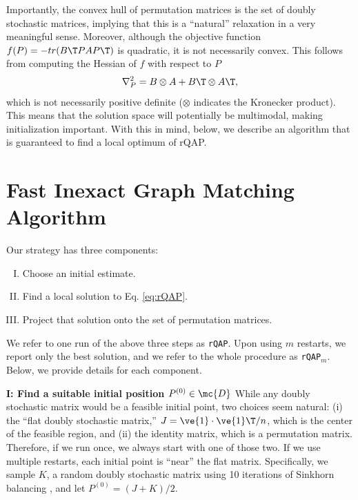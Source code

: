 \documentclass[10pt,journal,cspaper,compsoc]{IEEEtran}
\begin{document}
Importantly, the convex hull of permutation matrices is the set of doubly stochastic matrices, implying that this is a ``natural'' relaxation in a very meaningful sense.    Moreover, although the objective function $f(P)=- tr(B\T PAP\T)$ is quadratic, it is not necessarily convex.  This follows from computing the Hessian of $f$  with respect to $P$
\begin{align}
	\nabla_P^2  =  B \otimes A + B\T \otimes A\T,
\end{align}
which is not necessarily positive definite ($\otimes$ indicates the Kronecker product). This means that the solution space will potentially be multimodal, making initialization important.  With this in mind, below, we describe an algorithm that is guaranteed to find a local optimum of rQAP.


\section{Fast Inexact Graph Matching Algorithm} %
\label{ssub:graph_matching}


Our strategy has three components:
\begin{enumerate}[I.]
	\item Choose an initial estimate.
	\item Find a local solution to Eq. \eqref{eq:rQAP}.
	\item Project that solution onto the set of permutation matrices.
\end{enumerate}
We refer to one run of the above three steps as \texttt{rQAP}.  Upon using $m$ restarts, we report only the best solution, and we refer to the whole procedure as \texttt{rQAP}$_m$.  Below, we provide details for each component.

\textbf{I: Find a suitable initial position $P^{(0)} \in \mc{D}$}  While any doubly stochastic matrix would be a feasible initial point, two choices seem natural: (i) the ``flat doubly  stochastic matrix,'' $J=\ve{1} \cdot \ve{1}\T/n$, which is the center of the feasible region, and (ii) the identity matrix, which is a permutation matrix.  Therefore, if we run \rqap  once, we always start with one of those two.  If we use multiple restarts, each initial point is ``near'' the flat matrix.  Specifically, we sample $K$, a random doubly stochastic matrix using 10 iterations of Sinkhorn balancing \cite{Sinkhorn1964}, and let $P^{(0)}=(J+K)/2$. %
\end{document}
